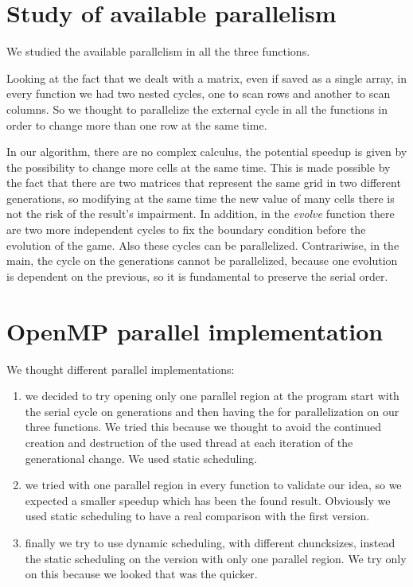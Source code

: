 \documentclass[a4paper,11pt,twoside]{report}
\begin{document}
\chapter{Study of available parallelism}

\noindent We studied the available parallelism in all the three functions. 

\noindent Looking at the fact that we dealt with a matrix, even if saved as a single array, in every function we had two nested cycles, one to scan rows and another to scan columns. So we thought to parallelize the external cycle in all the functions in order to change more than one row at the same time. 

\noindent In our algorithm, there are no complex calculus, the potential speedup is given by the possibility to change more cells at the same time. This is made possible by the fact that there are two matrices that represent the same grid in two different generations, so modifying at the same time the new value of many cells there is not the risk of the result's impairment. 
In addition, in the \emph{evolve} function there are two more independent cycles to fix the boundary condition before the evolution of the game. Also these cycles can be parallelized. 
Contrariwise, in the main, the cycle on the generations cannot be parallelized, because one evolution is dependent on the previous, so it is fundamental to preserve the serial order. 

\chapter{OpenMP parallel implementation}
We thought different parallel implementations:
\begin{enumerate}
	\item we decided to try opening only one parallel region at the program start with the serial cycle on generations and then having the for parallelization on our three functions. We tried this because we thought to avoid the continued creation and destruction of the used thread at each iteration of the generational change. We used static scheduling.
	\item we tried with one parallel region in every function to validate our idea, so we expected a smaller speedup which has been the found result. Obviously we used static scheduling to have a real comparison with the first version.
	\item finally we try to use dynamic scheduling, with different chuncksizes, instead the static scheduling on the version with only one parallel region. We try only on this because we looked that was the quicker.
	\end{enumerate}
	
\end{document}
